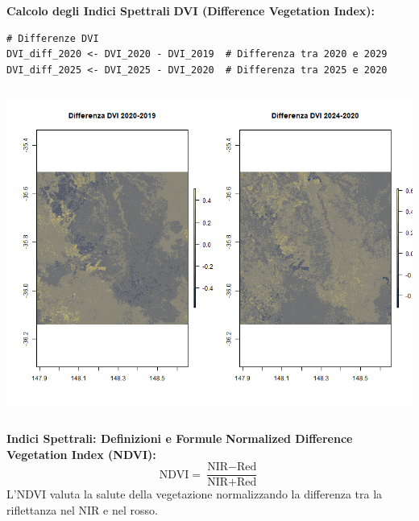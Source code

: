 \documentclass{beamer}
\begin{document}
\begin{frame}[fragile]{\textbf{Calcolo degli Indici Spettrali}}
\textbf{DVI (Difference Vegetation Index):}
\begin{lstlisting}
# Differenze DVI
DVI_diff_2020 <- DVI_2020 - DVI_2019  # Differenza tra 2020 e 2029
DVI_diff_2025 <- DVI_2025 - DVI_2020  # Differenza tra 2025 e 2020
\end{lstlisting}
\begin{columns}
    \centering
    \includegraphics[width=\textwidth]{DVI_diff.png}
\end{columns}
\end{frame}

\begin{frame}{\textbf{Indici Spettrali: Definizioni e Formule}}
\textbf{Normalized Difference Vegetation Index (NDVI):}
\newline
\begin{equation}
\text{NDVI} = \frac{\text{NIR} - \text{Red}}{\text{NIR} + \text{Red}}
\end{equation}
\newline
L'NDVI valuta la salute della vegetazione normalizzando la differenza tra la riflettanza nel NIR e nel rosso.
\end{frame}
\end{document}
